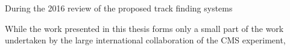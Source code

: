During the 2016 review of the proposed track finding systems 

While the work presented in this thesis forms only a small part of the work undertaken by the large international collaboration of the CMS experiment, 


%
